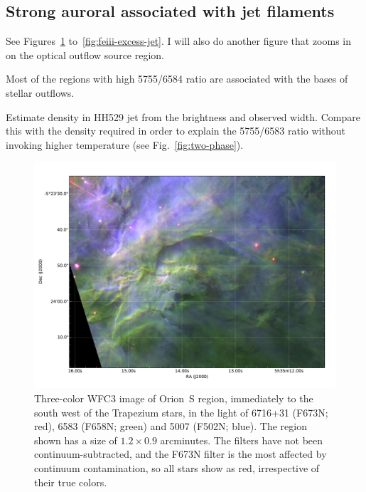 \documentclass[preprint]{aastex}
\begin{document}
\subsection{Strong auroral \nii{} associated with jet filaments}
\label{sec:jets}

See Figures~\ref{fig:rgb-jet} to~\ref{fig:feiii-excess-jet}.  I will
also do another figure that zooms in on the optical outflow source
region.  

Most of the regions with high 5755/6584 ratio are associated with the
bases of stellar outflows. 

Estimate density in HH529 jet from the \ha{} brightness and observed
width.  Compare this with the density required in order to explain the
5755/6583 ratio without invoking higher temperature (see
Fig.~\ref{fig:two-phase}).

\begin{figure}
  \centering
  \includegraphics[width=\linewidth]{jet_region_rgb}
  \caption{Three-color WFC3 image of Orion~S region, immediately to
    the south west of the Trapezium stars, in the light of \sii{}
    6716+31 (F673N; red), \nii{} 6583 (F658N; green) and \oiii{} 5007
    (F502N; blue).  The region shown has a size of \(1.2 \times 0.9\)
    arcminutes.  The filters have not been continuum-subtracted, and
    the F673N filter is the most affected by continuum contamination,
    so all stars show as red, irrespective of their true colors.}
  \label{fig:rgb-jet}
\end{figure}
\end{document}
